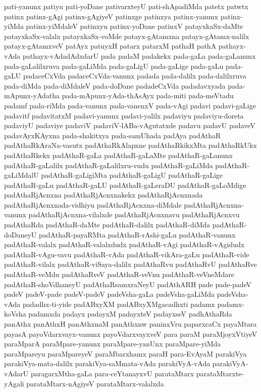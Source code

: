 {pati-yanunx
patiyu
pati-yoDane
pativarxteyU
pati-shApadiMda
patetx
patwtx
patinx
patinx-gAgi
patinx-gAgiyeV
patinxge
patinxya
patinx-yanunx
patinx-yiMda
patinx-yiMdaleV
patinxyu
patinx-yoDane
patinxV
patayxkaSx-daMte
patayxkaSx-valalx
patayxkaSx-voMde
patayx-gAtamxna
patayx-gAtamx-nalilx
patayx-gAtamxveV
patAyx
patuyxH
patarx
patarxM
pathaH
pathA
pathayx-vAda
pathayx-vAdadAdxdarU
pada
padaM
padakekx
pada-gaLa
pada-gaLanunx
pada-gaLalilxruva
pada-gaLiMda
pada-gaLigU
pada-gaLige
pada-gaLu
pada-gaLU
padaceCxVda
padaceCxVda-vanunx
padada
pada-dalilx
pada-dalilxruva
pada-diMda
pada-diMdaleV
pada-doDane
padadeCxVda
padadavxyada
pada-mApunx-yAdatha
pada-mApunx-yAda-thAsAyx
pada-miti
pada-meVtadu
padamf
pada-riMda
pada-vanunx
pada-vanenxV
pada-vAgi
padavi
padavi-gaLige
padavitf
padavitatxM
padavi-yanunx
padavi-yalilx
padaviyu
padaviyu-doreta
padaviyU
padaviye
padaviV
padaviV-lABa-vAgutatxde
padavu
padavU
padaveV
padavAyxKAyxna
pada-shakitxya
pada-samUhada
padAya
padAthaR
padAthaRkAraNa-vasutx
padAthaRkAlapxne
padAthaRkikxMta
padAthaRkUkx
padAthaRkekx
padAthaR-gaLa
padAthaR-gaLaMte
padAthaR-gaLanunx
padAthaR-gaLalilx
padAthaR-gaLalilxru-vudu
padAthaR-gaLiMda
padAthaR-gaLiMdalU
padAthaR-gaLigiMta
padAthaR-gaLigU
padAthaR-gaLige
padAthaR-gaLu
padAthaR-gaLU
padAthaR-gaLeraDU
padAthaR-gaLoMdige
padAthaRjAcnxna
padAthaRjAcnxnakekx
padAthaRjAcnxnada
padAthaRjAcnxnada-vidhiyu
padAthaRjAcnxna-diMdale
padAthaRjAcnxna-vanunx
padAthaRjAcnxna-vilalxde
padAthaRjAcnxnavu
padAthaRjAcnxvu
padAthaRda
padAthaR-daMte
padAthaR-dalilx
padAthaR-diMda
padAthaR-doDaneyU
padAthaR-payaRMta
padAthaR-rAshi-gaLu
padAthaR-vanunx
padAthaR-valalx
padAthaR-valalxdudx
padAthaR-vAgi
padAthaR-vAgidudx
padAthaR-vAgu-vavu
padAthaR-vAda
padAthaR-vikAra-gaLu
padAthaR-vide
padAthaR-vilalx
padAthaR-viSaya-dalilx
padAthaRvu
padAthaRvU
padAthaRve
padAthaR-veMdu
padAthaRveV
padAthaR-veVnu
padAthaR-veVneMdare
padAthaR-shoVdhaneyU
padAthaRsamxraNeyU
padAthARH
pade
pade-padeV
padeV
padeV-pade
padeV-padeV
padeVsha-gaLa
padeVsha-gaLiMda
padeVsha-vAda
padadhx-ti-yide
padABxyXM
padABxyXMgacadhxti
padamx
padamx-koVsha
padamxda
padayx
padayxM
padayxteV
padayxseV
padhAthaRda
panAthx
panAthxH
panAthxnaM
panAthxnw
paninxVru
paparxcaCx
payaMtara
payasA
payoVdarxvayx-vanunx
payoVdarxvayxveV
para
paraM
paraMjoyxVtiyeV
paraMparA
paraMpare-yanunx
paraMpare-yanUnx
paraMpare-yiMda
paraMpareyu
paraMpareyeV
paraMbarxhamx
paraH
para-EvAyaM
parakiVya
parakiVya-mata-dalilx
parakiVya-saMmata-vAda
parakiVyA-vAda
parakiVyA-vAdarU
paragarxMtha-gaLa
para-ceYtanayxvU
parataMtarx
parataMtarxte-yAgali
parataMtarx-nAgiyeV
parataMtarx-valalxda
}
